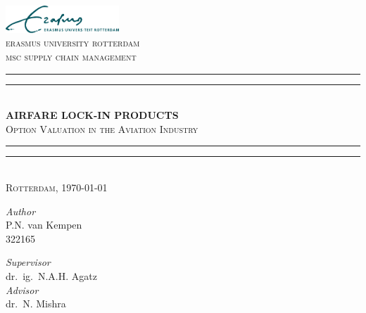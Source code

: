 \begin{titlingpage}
\begin{center}
\large

\vspace*{1.5cm}
\includegraphics[width=0.32\textwidth]{figures/EURlogo.pdf} \\[0.7\baselineskip]
\textsc{\Large erasmus university rotterdam\\
		msc supply chain management} \\[1.5\baselineskip]
 
\rule{\textwidth}{1.2pt}\vspace{-\baselineskip}\vspace{1.8pt}
\rule{\textwidth}{0.4pt} \\[2.6\baselineskip]

\textbf{\LARGE AIRFARE LOCK-IN PRODUCTS} \\[1.0\baselineskip]
\textsc{\Large Option Valuation in the Aviation Industry}\\[1.8\baselineskip]

\rule{\textwidth}{0.4pt}\vspace{-\baselineskip}\vspace{2.4pt}
\rule{\textwidth}{1.2pt} \\[2.25\baselineskip]

\textsc{Rotterdam, \today} \\[3.75\baselineskip]

\begin{minipage}[b]{0.4\textwidth}
	\flushleft
	\textsl{Author} \\[0.1\baselineskip]
	P.N. van Kempen \\
	322165
	\vfill
\end{minipage}
\begin{minipage}{0.4\textwidth}
	\flushright
	\textsl{Supervisor} \\[0.1\baselineskip]
	dr.~ig.~N.A.H. Agatz \\[1.2\baselineskip]

	\textsl{Advisor} \\[0.1\baselineskip]
	dr.~N. Mishra
\end{minipage}


\end{center}
\end{titlingpage}
